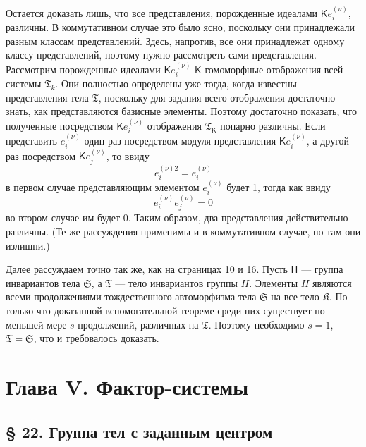 \documentclass[11pt]{article}
\begin{document}
Остается доказать лишь, что все представления, порожденные идеалами \(\mathsf K e_i^{(\nu)}\), различны. В коммутативном случае это было ясно, поскольку они принадлежали разным классам представлений. Здесь, напротив, все они принадлежат одному классу представлений, поэтому нужно рассмотреть сами представления. Рассмотрим порожденные идеалами \(\mathsf K e_i^{(\nu)}\) \(\mathsf{K}\)-гомоморфные отображения всей системы \(\mathfrak T_k\). Они полностью определены уже тогда, когда известны представления тела \(\mathfrak T\), поскольку для задания всего отображения достаточно знать, как представляются базисные элементы. Поэтому достаточно показать, что полученные посредством \(\mathsf K e_i^{(\nu)}\) отображения \(\mathfrak T_{\mathsf{K}}\) попарно различны. Если представить \(e_i^{(\nu)}\) один раз посредством модуля представления \(\mathsf K e_i^{(\nu)}\), а другой раз посредством \(\mathsf K e_j^{(\nu)}\), то ввиду
\[
e_i^{(\nu)2}=e_i^{(\nu)}
\]
в первом случае представляющим элементом \(e_i^{(\nu)}\) будет 1, тогда как ввиду
\[
e_i^{(\nu)}e_j^{(\nu)}=0
\]
во втором случае им будет 0. Таким образом, два представления действительно различны. (Те же рассуждения применимы и в коммутативном случае, но там они излишни.)

Далее рассуждаем точно так же, как на страницах 10 и 16. Пусть \(\mathsf{H}\) --- группа инвариантов тела \(\mathfrak S\), а \(\mathfrak T\) --- тело инвариантов группы \(H\). Элементы \(H\) являются всеми продолжениями тождественного автоморфизма тела \(\mathfrak S\) на все тело \(\mathfrak K\). По только что доказанной вспомогательной теореме среди них существует по меньшей мере \(s\) продолжений, различных на \(\mathfrak T\). Поэтому необходимо \(s=1\), \(\mathfrak T=\mathfrak S\), что и требовалось доказать.

\section*{Глава V. Фактор-системы}\label{kapitel-v.-faktorensysteme}

\subsection*{§ 22. Группа тел с заданным центром}\label{die-gruppe-der-koerper-mit-gegebenem-zentrum}
\end{document}
